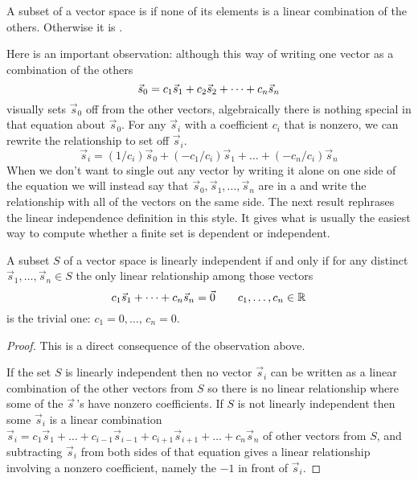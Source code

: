 \begin{definition}
\label{def:LinInd}
A subset of a vector space is
%
if none of its elements is a linear combination of the others.
Otherwise it is .
\end{definition}

Here is an important observation:
although this way of writing one vector as a combination of the others
\begin{equation*}
   \vec{s}_0=c_1\vec{s}_1+c_2\vec{s}_2+\cdots +c_n\vec{s}_n
\end{equation*}
visually sets \( \vec{s}_0 \) off from the other vectors, algebraically
there is nothing special in that equation about \( \vec{s}_0 \).
For any \( \vec{s}_i \) with a coefficient $c_i$ that is nonzero,
we can rewrite the relationship to set off \( \vec{s}_i \).
\begin{equation*}
   \vec{s}_i=(1/c_i)\vec{s}_0+(-c_1/c_i)\vec{s}_1
              +\dots+(-c_n/c_i)\vec{s}_n
\end{equation*}
When we don't want to single out any vector by writing it alone on
one side of the equation we will instead say that
\( \vec{s}_0,\vec{s}_1,\dots,\vec{s}_n \) are in a
%
and write the relationship
with all of the vectors on the same side.
The next result rephrases the linear independence definition in this style.
It gives what is usually the easiest way to compute whether
a finite set is dependent or independent.

\begin{lemma}   \label{le:LDIffANonTrivLinRel}
A subset \( S \) of a vector space is linearly independent if and only if for
any distinct \( \vec{s}_1,\dots,\vec{s}_n\in S \) the only linear
relationship among those vectors
\begin{equation*}
   c_1\vec{s}_1+\dots+c_n\vec{s}_n=\vec{0}
   \qquad c_1,\dots,c_n\in\mathbb{R}
\end{equation*}
is the trivial one: \( c_1=0,\dots,\,c_n=0 \).
\end{lemma}

\begin{proof}
This is a direct consequence of the observation above.

If the set \( S \) is linearly independent then no vector
$\vec{s}_i$ can be written 
as a linear combination of the other vectors from $S$
so there is no linear relationship where some of the $\vec{s}\,$'s have 
nonzero coefficients.
If \( S \) is not linearly independent then some \( \vec{s}_i \) is a linear
combination 
$\vec{s}_i=c_1\vec{s}_1+\dots+c_{i-1}\vec{s}_{i-1}
    +c_{i+1}\vec{s}_{i+1}+\dots+c_n\vec{s}_n$
of other vectors from \( S \), and subtracting $\vec{s}_i$ from both sides
of that equation gives a linear relationship
involving a nonzero coefficient, 
namely the \( -1 \) in front of \( \vec{s}_i \).
\end{proof}

